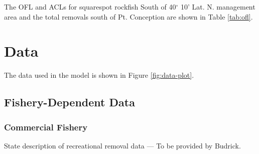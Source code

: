 \documentclass[11pt,
  english,
  a4paper,
]{article}
\begin{document}
\leavevmode\tagmcend\tagstructend\par


The OFL and ACLs for squarespot rockfish South of 40{\(^\circ\)\leavevmode\tagmcend\tagstructend} 10' Lat. N. management area and the total removals south of Pt. Conception are shown in Table \ref{tab:ofl}.

\leavevmode\tagmcend\tagstructend\par


\hypertarget{data}{%
\section{Data}\label{data}}

\leavevmode\tagmcend\tagstructend


The data used in the model is shown in Figure \ref{fig:data-plot}.

\leavevmode\tagmcend\tagstructend\par


\hypertarget{fishery-dependent-data}{%
\subsection{Fishery-Dependent Data}\label{fishery-dependent-data}}

\leavevmode\tagmcend\tagstructend


\hypertarget{commercial-fishery}{%
\subsubsection{Commercial Fishery}\label{commercial-fishery}}

\leavevmode\tagmcend\tagstructend


State description of recreational removal data --- To be provided by Budrick.

\leavevmode\tagmcend\tagstructend\par

\end{document}
